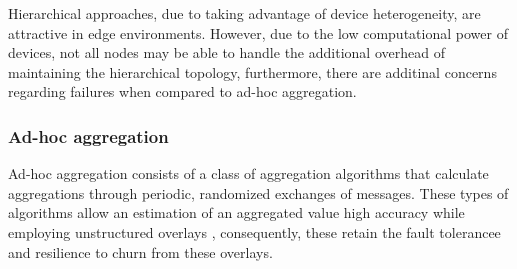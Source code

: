 Hierarchical approaches, due to taking advantage of device heterogeneity, are attractive in edge environments. However, due to the low computational power of devices, not all nodes may be able to handle the additional overhead of maintaining the hierarchical topology, furthermore, there are additinal concerns regarding failures when compared to ad-hoc aggregation.


\subsubsection*{Ad-hoc aggregation}

Ad-hoc aggregation consists of a class of aggregation algorithms that calculate aggregations through periodic, randomized exchanges of messages. These types of algorithms allow an estimation of an aggregated value high accuracy while employing unstructured overlays \cite{gossip_aggregation}, consequently, these retain the fault tolerancee and resilience to churn from these overlays.







